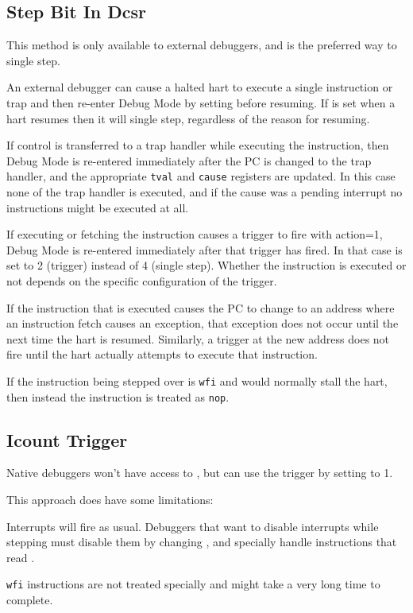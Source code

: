 \subsection{Step Bit In Dcsr} \label{stepBit}

This method is only available to external debuggers, and is the preferred way
to single step.

An external debugger can cause a halted hart to execute a single instruction or
trap and then re-enter Debug Mode by setting \FcsrDcsrStep before resuming.  If
\FcsrDcsrStep is set when a hart resumes then it will single step, regardless
of the reason for resuming.

If control is transferred to a trap handler while executing the instruction,
then Debug Mode is re-entered immediately after the PC is changed to the trap
handler, and the appropriate {\tt tval} and {\tt cause} registers are updated.
In this case none of the trap handler is executed, and if the cause was a
pending interrupt no instructions might be executed at all.

If executing or fetching the instruction causes a trigger to fire with action=1, Debug Mode
is re-entered immediately after that trigger has fired. In that case \FcsrDcsrCause is
set to 2 (trigger) instead of 4 (single step).  Whether the instruction is
executed or not depends on the specific configuration of the trigger.

If the instruction that is executed causes the PC to change to an address where
an instruction fetch causes an exception, that exception does not occur until
the next time the hart is resumed. Similarly, a trigger at the new address does
not fire until the hart actually attempts to execute that instruction.

If the instruction being stepped over is {\tt wfi} and would normally stall the
hart, then instead the instruction is treated as {\tt nop}.

\subsection{Icount Trigger}

Native debuggers won't have access to \RcsrDcsr, but can use the \RcsrIcount
trigger by setting \FcsrIcountCount to 1.

\begin{steps}{This approach does have some limitations:}
    \item Interrupts will fire as usual. Debuggers that want to disable
        interrupts while stepping must disable them by changing \Rmstatus, and
        specially handle instructions that read \Rmstatus.
    \item {\tt wfi} instructions are not treated specially and might take a
        very long time to complete.
\end{steps}

